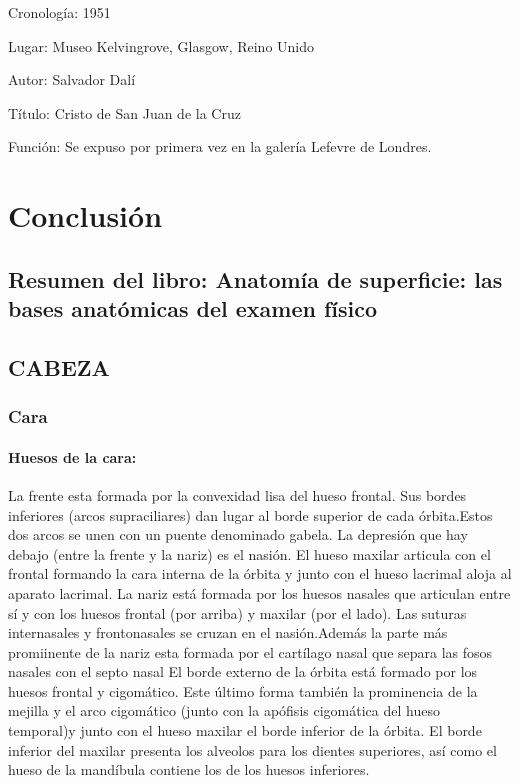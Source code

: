 \documentclass[a4paper,12pt]{article} %
\begin{document}
Cronología: 1951

Lugar: Museo Kelvingrove, Glasgow, Reino Unido

Autor: Salvador Dalí

Título: Cristo de San Juan de la Cruz

Función: Se expuso por primera vez en la galería Lefevre de Londres. %

\section{Conclusión}
\newpage

\begin{appendices}

\section{Resumen del libro: Anatomía de superficie: las bases anatómicas del examen físico}

\subsection{CABEZA}

\subsubsection{Cara}

\paragraph{Huesos de la cara:} La frente esta formada por la convexidad lisa del hueso frontal. Sus bordes inferiores (arcos supraciliares) dan lugar al borde superior de cada órbita.Estos dos arcos se unen con un puente denominado gabela. La depresión que hay debajo (entre la frente y la nariz) es el nasión.
El hueso maxilar articula con el frontal formando la cara interna de la órbita y junto con el hueso lacrimal aloja al aparato lacrimal.
La nariz  está formada por los huesos nasales que articulan entre sí y con los huesos frontal (por arriba) y maxilar (por el lado). Las suturas internasales y frontonasales se cruzan en el nasión.Además la parte más promiinente de la nariz esta formada por el cartílago nasal que separa las fosos nasales con el septo nasal
El borde externo de la órbita está formado por los huesos frontal y cigomático. Este último forma también la prominencia de la mejilla y el arco cigomático (junto con la apófisis cigomática del hueso temporal)y junto con el hueso maxilar el borde inferior de la órbita.
El borde inferior del maxilar presenta los alveolos para los dientes superiores, así como el hueso de la mandíbula contiene los de los huesos inferiores.


\end{appendices}
\end{document}
